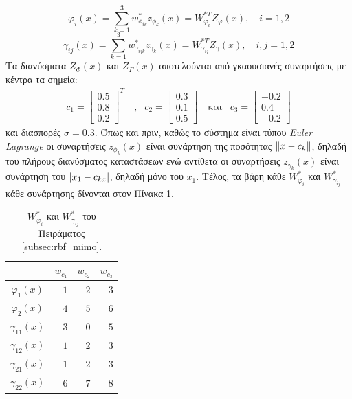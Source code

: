 \begin{equation}
	\varphi_i(x) = \sum_{k = 1}^{3} w_{\phi_{ik}}^* z_{\phi_k} (x) = W_{\varphi_i}^{*T} Z_\varphi(x), \quad i = 1,2
	\label{eq:mimo_zphi_def}
\end{equation}
\begin{equation}
\gamma_{ij}(x) = \sum_{k = 1}^{3} w_{\gamma_{ijk}}^* z_{\gamma_k} (x) = W_{\gamma_{ij}}^{*T} Z_{\gamma}(x), \quad i,j = 1,2
\label{eq:mimo_zgamma_def}
\end{equation}
Τα διανύσματα $Z_\Phi(x)$ και $Z_\Gamma(x)$ αποτελούνται από γκαουσιανές συναρτήσεις με κέντρα τα σημεία:
\begin{equation*}
\begin{matrix}
c_1 = \begin{bmatrix}  0.5 \\ 0.8 \\  0.2 \end{bmatrix}^Τ & \: \text{,} &
c_2 = \begin{bmatrix}  0.3 \\ 0.1 \\  0.5 \end{bmatrix} & \: \text{και} &
c_3 = \begin{bmatrix} -0.2 \\ 0.4 \\ -0.2 \end{bmatrix} 
\end{matrix}
\end{equation*}
και διασπορές $\sigma = 0.3$. Όπως και πριν, καθώς το σύστημα είναι τύπου \textit{Euler Lagrange} οι συναρτήσεις $z_{\phi_k}(x)$ είναι συνάρτηση της ποσότητας $\norm{x - c_k}$, δηλαδή του πλήρους διανύσματος καταστάσεων ενώ αντίθετα οι συναρτήσεις $z_{\gamma_k}(x)$ είναι συνάρτηση του $\abs{x_1 - c_{kx}}$, δηλαδή μόνο του $x_1$. Τέλος, τα βάρη κάθε $W_{\varphi_i}^{*}$ και $W_{\gamma_{ij}}^{*}$ κάθε συνάρτησης δίνονται στον Πίνακα \ref{tab:mimo_wstar}.
\begin{table}
	\centering
	\begin{tabular}{  c || r | r | r }
		\hline\hline
		\text{Συνάρτηση} & $w_{c_1}$ & $w_{c_2}$ & $w_{c_3}$ \\
		\hline\hline
		$\varphi_1(x)$ & $1$ & $2$ & $3$  \\ \hline
		$\varphi_2(x)$ & $4$ & $5$ & $6$  \\ \hline
		$\gamma_{11}(x)$ & $3$ & $0$ & $5$ \\ \hline
		$\gamma_{12}(x)$ & $1$ & $2$ & $3$ \\ \hline
		$\gamma_{21}(x)$ & $-1$ & $-2$ & $-3$ \\ \hline
		$\gamma_{22}(x)$ & $6$ & $7$ & $8$ \\ \hline \hline
	\end{tabular}
	\caption{$W_{\varphi_i}^{*}$ και $W_{\gamma_{ij}}^{*}$ του Πειράματος \ref{subsec:rbf_mimo}.}
	\label{tab:mimo_wstar}
\end{table}

